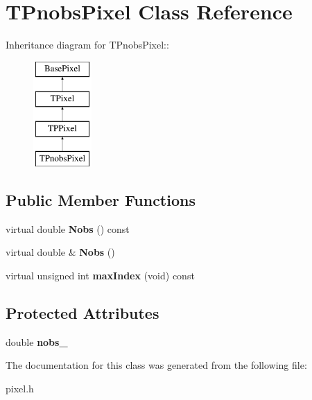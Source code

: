\hypertarget{classTPnobsPixel}{
\section{TPnobsPixel Class Reference}
\label{classTPnobsPixel}
}
Inheritance diagram for TPnobsPixel::\begin{figure}[H]
\begin{center}
\leavevmode
\includegraphics[height=4cm]{classTPnobsPixel}
\end{center}
\end{figure}
\subsection*{Public Member Functions}
\begin{DoxyCompactItemize}
\item 
\hypertarget{classTPnobsPixel_ada63ac239377df8dcf5c44ac069033c7}{
virtual double {\bfseries Nobs} () const }
\label{classTPnobsPixel_ada63ac239377df8dcf5c44ac069033c7}

\item 
\hypertarget{classTPnobsPixel_a460824f9e3c6143f31d49a0569eb0312}{
virtual double \& {\bfseries Nobs} ()}
\label{classTPnobsPixel_a460824f9e3c6143f31d49a0569eb0312}

\item 
\hypertarget{classTPnobsPixel_ae82f73fafdfb05907c946cb389d2e10e}{
virtual unsigned int {\bfseries maxIndex} (void) const }
\label{classTPnobsPixel_ae82f73fafdfb05907c946cb389d2e10e}

\end{DoxyCompactItemize}
\subsection*{Protected Attributes}
\begin{DoxyCompactItemize}
\item 
\hypertarget{classTPnobsPixel_ae6af4a5c32194106d8cde72dd1f84f84}{
double {\bfseries nobs\_\-}}
\label{classTPnobsPixel_ae6af4a5c32194106d8cde72dd1f84f84}

\end{DoxyCompactItemize}


The documentation for this class was generated from the following file:\begin{DoxyCompactItemize}
\item 
pixel.h\end{DoxyCompactItemize}
